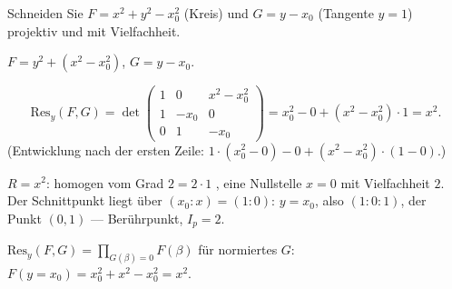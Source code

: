 \begin{aufgabe}
Schneiden Sie $F = x^{2} + y^{2} - x_0^{2}$ (Kreis) und $G = y - x_0$ (Tangente $y = 1$) projektiv und mit Vielfachheit.

\loesung
{}
$F = y^{2} + (x^{2} - x_0^{2})$, $G = y - x_0$.

\[ \mathrm{Res}_y(F, G) = \det\begin{pmatrix}1 & 0 & x^{2} - x_0^{2}\\ 1 & -x_0 & 0\\ 0 & 1 & -x_0\end{pmatrix} = x_0^{2} - 0 + (x^{2} - x_0^{2})\cdot1 = x^{2} . \]
(Entwicklung nach der ersten Zeile: $1\cdot(x_0^{2} - 0) - 0 + (x^{2} - x_0^{2})\cdot(1 - 0)$.)

$R = x^{2}$: homogen vom Grad $2 = 2\cdot1$ \checkmark, eine Nullstelle $x = 0$ mit Vielfachheit $2$. Der Schnittpunkt liegt über $(x_0 : x) = (1 : 0)$: $y = x_0$, also $(1 : 0 : 1)$, der Punkt $(0, 1)$ --- Berührpunkt, $I_p = 2$.

$\mathrm{Res}_y(F, G) = \prod_{G(\beta) = 0}F(\beta)$ für normiertes $G$: $F(y = x_0) = x_0^{2} + x^{2} - x_0^{2} = x^{2}$. \checkmark

\begin{center}
\begin{minipage}{0.88\textwidth}
\end{minipage}
\end{center}
\end{aufgabe}

